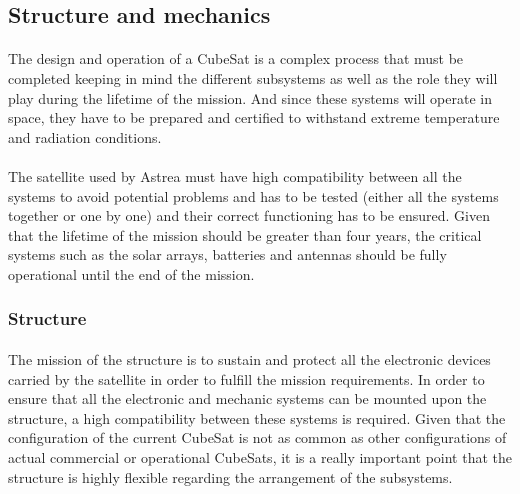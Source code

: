 \subsection{Structure and mechanics}

\paragraph{}The design and operation of a CubeSat is a complex process that must be completed keeping in mind the different subsystems as well as the role they will play during the lifetime of the mission. And since these systems will operate in space, they have to be prepared and certified to withstand extreme temperature and radiation conditions.

\paragraph{}The satellite used by Astrea must have high compatibility between all the systems to avoid potential problems and has to be tested (either all the systems together or one by one) and their correct functioning has to be ensured. Given that the lifetime of the mission should be greater than four years, the critical systems such as the solar arrays, batteries and antennas should be fully operational until the end of the mission.

\subsubsection{Structure}

\paragraph{}The mission of the structure is to sustain and protect all the electronic devices carried by the satellite in order to fulfill the mission requirements. In order to ensure that all the electronic and mechanic systems can be mounted upon the structure, a high compatibility between these systems is required. Given that the configuration of the current CubeSat is not as common as other configurations of actual commercial or operational CubeSats, it is a really important point that the structure is highly flexible regarding the arrangement of the subsystems.

